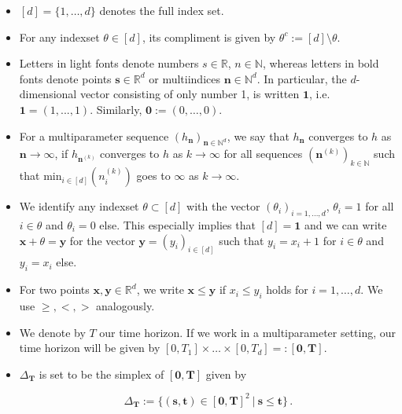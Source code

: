 \documentclass[11pt,oneside,english,reqno]{amsart}
\numberwithin{equation}{section}
\numberwithin{figure}{section}
\theoremstyle{plain}
\theoremstyle{definition}
\theoremstyle{remark}
\theoremstyle{plain}
\theoremstyle{plain}
\theoremstyle{plain}
\theoremstyle{plain}
\theoremstyle{plain}
\newcommand{\NN}{\mathbb{N}}
\newcommand{\RR}{\mathbb{R}}
\newcommand{\bn}{\mathbf{n}}
\newcommand{\bT}{\mathbf{T}}
\newcommand{\bx}{\mathbf{x}}
\newcommand{\by}{\mathbf{y}}
\newcommand{\boo}{\mathbf{0}}
\newcommand{\bs}{\mathbf{s}}
\newcommand{\bt}{\mathbf{t}}
\begin{document}
\begin{itemize}
    \item $[d] = \{1,\dots, d\}$ denotes the full index set.

    \item For any indexset $\theta\in[d]$, its compliment is given by $\theta^c := [d]\setminus\theta$.
    
    \item Letters in light fonts denote numbers $s\in\RR$, $n\in\NN$, whereas letters in bold fonts denote points $\bs\in\RR^d$ or multiindices $\bn\in\NN^d$. In particular, the $d$-dimensional vector consisting of only number 1, is written $\mathbf{1}$, i.e. $\mathbf{1}=(1,...,1)$. Similarly, $\mathbf{0} := (0,\dots,0)$. 

    \item For a multiparameter sequence $(h_\bn)_{\bn\in\NN^d}$, we say that $h_\bn$ converges to $h$ as $\bn\to\infty$, if $h_{\bn^{(k)}}$ converges to $h$ as $k\to\infty$ for all sequences $(\bn^{(k)})_{k\in\NN}$ such that $\mbox{min}_{i\in[d]}(n^{(k)}_i)$ goes to $\infty$ as $k\to\infty$.
    
    \item We identify any indexset $\theta\subset[d]$ with the vector $(\theta_i)_{i=1,\dots,d}$, $\theta_i = 1$ for all $i\in\theta$ and $\theta_i = 0$ else. This especially implies that $[d] = \mathbf 1$ and we can write $\bx+\theta = \by$ for the vector $\by = (y_i)_{i\in[d]}$ such that $y_i = x_i+1$ for $i\in\theta$ and $y_i = x_i$ else.

    \item For two points $\bx,\by\in\RR^d$, we write $\bx\le\by$ if $x_i\le y_i$ holds for $i=1,\dots,d$. We use $\ge,<,>$ analogously.

    \item We denote by $T$ our time horizon. If we work in a multiparameter setting, our time horizon will be given by $[0,T_1]\times\dots\times[0,T_d] =: [\boo,\bT]$.

    \item $\Delta_\bT$ is set to be the simplex of $[\boo,\bT]$ given by

    \begin{equation*}
        \Delta_\bT := \{(\bs,\bt)\in[\boo,\bT]^2~\vert~\bs\le\bt\}\,.
    \end{equation*}
\end{itemize}
\end{document}
